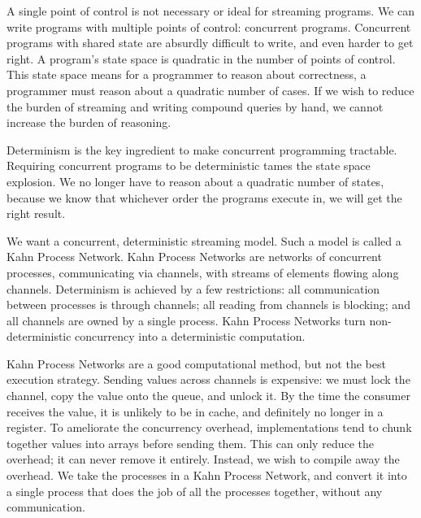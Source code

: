 A single point of control is not necessary or ideal for streaming programs.
We can write programs with multiple points of control: concurrent programs.
Concurrent programs with shared state are absurdly difficult to write, and even harder to get right.
A program's state space is quadratic in the number of points of control.
This state space means for a programmer to reason about correctness, a programmer must reason about a quadratic number of cases.
If we wish to reduce the burden of streaming and writing compound queries by hand, we cannot increase the burden of reasoning.

Determinism is the key ingredient to make concurrent programming tractable.
Requiring concurrent programs to be deterministic tames the state space explosion.
We no longer have to reason about a quadratic number of states, because we know that whichever order the programs execute in, we will get the right result.

We want a concurrent, deterministic streaming model.
Such a model is called a Kahn Process Network.
Kahn Process Networks are networks of concurrent processes, communicating via channels, with streams of elements flowing along channels.
Determinism is achieved by a few restrictions: all communication between processes is through channels; all reading from channels is blocking; and all channels are owned by a single process.
Kahn Process Networks turn non-deterministic concurrency into a deterministic computation.

% 
% 

Kahn Process Networks are a good computational method, but not the best execution strategy.
Sending values across channels is expensive: we must lock the channel, copy the value onto the queue, and unlock it.
By the time the consumer receives the value, it is unlikely to be in cache, and definitely no longer in a register.
To ameliorate the concurrency overhead, implementations tend to chunk together values into arrays before sending them.
This can only reduce the overhead; it can never remove it entirely.
Instead, we wish to compile away the overhead.
We take the processes in a Kahn Process Network, and convert it into a single process that does the job of all the processes together, without any communication.

